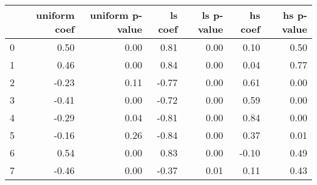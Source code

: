 \begin{tabular}{lrrrrrr}
\toprule
 & uniform coef & uniform p-value & ls coef & ls p-value & hs coef & hs p-value \\
\midrule
0 & 0.50 & 0.00 & 0.81 & 0.00 & 0.10 & 0.50 \\
1 & 0.46 & 0.00 & 0.84 & 0.00 & 0.04 & 0.77 \\
2 & -0.23 & 0.11 & -0.77 & 0.00 & 0.61 & 0.00 \\
3 & -0.41 & 0.00 & -0.72 & 0.00 & 0.59 & 0.00 \\
4 & -0.29 & 0.04 & -0.81 & 0.00 & 0.84 & 0.00 \\
5 & -0.16 & 0.26 & -0.84 & 0.00 & 0.37 & 0.01 \\
6 & 0.54 & 0.00 & 0.83 & 0.00 & -0.10 & 0.49 \\
7 & -0.46 & 0.00 & -0.37 & 0.01 & 0.11 & 0.43 \\
\bottomrule
\end{tabular}

